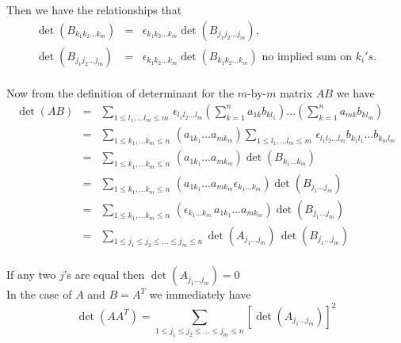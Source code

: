  Then we have the relationships that 
 \begin{eqnarray*}
 \det \left(B_{k_1k_2...k_m}\right) &=& \epsilon_{k_1k_2...k_m} \det \left(B_{j_1j_2...j_m}\right),\\
 \det \left(B_{j_1j_2...j_m}  \right) &=& \epsilon_{k_1k_2...k_m}  \det \left(B_{k_1k_2...k_m}\right)\mbox{ no implied sum on } k_i's.
\end{eqnarray*}\\
 Now from the definition of determinant for the $m$-by-$m$ matrix $AB$ we have 
 \begin{eqnarray*}
 \det (AB) &=& \sum_{1\le l_1,...l_m \le m} \, \epsilon_{l_1l_2...l_m} \left( \sum_{k=1}^n a_{1k} b_{kl_1} \right) ... \left( \sum_{k=1}^n a_{mk}b_{kl_m}\right)  \\
                &=& \sum_{1\le k_1,...k_m \le n} \, \left(a_{1k_1}...a_{mk_m}\right) \sum_{1\le l_1,...l_m \le m} \, \epsilon_{l_1l_2...l_m} b_{k_1l_1}  ... b_{k_ml_m} \\
                &=& \sum_{1\le k_1,...k_m \le n} \, \left( a_{1k_1}...a_{mk_m} \right) \det \left(B_{k_1...k_m}\right)\\
                &=& \sum_{1\le k_1,...k_m \le n} \, \left(a_{1k_1}...a_{mk_m} \epsilon_{k_1...k_m}\right) \det \left(B_{j_1...j_m}\right)\\
                &=& \sum_{1\le k_1,...k_m \le n} \, \left(\epsilon_{k_1...k_m} \, a_{1k_1}...a_{mk_m}\right) \det \left(B_{j_1...j_m}\right)\\
                &=& \sum_{1\le j_1 \le j_2 \le ...\le j_m \le n} \det \left(A_{j_1...j_m}\right)\,\det \left(B_{j_1...j_m}\right) \\
 \end{eqnarray*}
 
 If any two $j$'s are equal then $\det  \left(A_{j_1...j_m}\right) = 0$\\
 
 In the case of $A$ and $B = A^T$ we immediately have
$$ \det (AA^T) = \sum_{1\le j_1 \le j_2 \le ...\le j_m \le n} \left[ \det \left(A_{j_1...j_m}\right)\right]^2 $$
 
